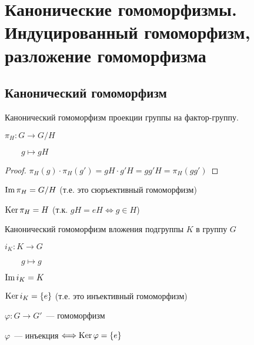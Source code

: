 \section{Канонические гомоморфизмы. Индуцированный гомоморфизм, разложение гомоморфизма}
\subsection*{Канонический гомоморфизм}

\begin{conj}
Канонический гомоморфизм проекции группы на фактор-группу.

$\pi_{H}: G \to G / H$

$\quad \quad g \mapsto gH$

\begin{proof}
    $\pi_{H}(g) \cdot \pi_{H}(g') = gH \cdot g'H = gg'H = \pi_{H}(gg')$
\end{proof}
$\operatorname{Im} \pi_{H} = G / H$ (т.е. это сюръективный гомоморфизм)

$\operatorname{Ker} \pi_{H} = H$ (т.к. $gH = eH \Leftrightarrow g \in H$) 
\end{conj}

\begin{conj}
Канонический гомоморфизм вложения подгруппы $K$ в группу $G$

$i_{K}: K \to G$

$\quad \quad g \mapsto g$

$\operatorname{Im} i_{K} = K$

$\operatorname{Ker} i_{K} = \{ e \}$ (т.е. это инъективный гомоморфизм)
\end{conj}

\notice 

$\varphi: G \to G'$~--- гомоморфизм

$\varphi$~--- инъекция $\Longleftrightarrow \operatorname{Ker} \varphi = \{ e \}$

